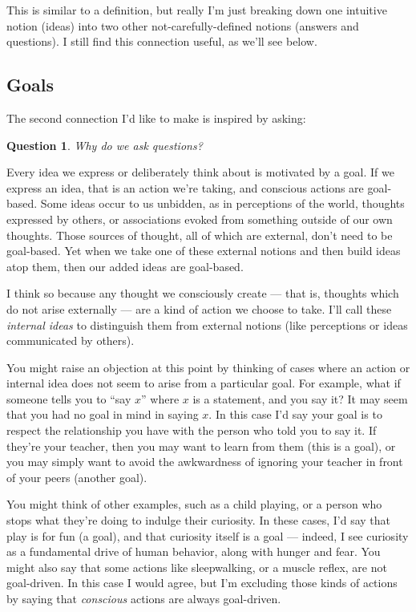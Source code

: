 \documentclass[11pt, oneside]{article}   	%
\newtheorem{question}{Question}
\begin{document}
This is similar to a definition, but really I'm just breaking down
one intuitive notion (ideas) into two other not-carefully-defined notions
(answers and questions). I still find this connection useful, as we'll see
below.

\subsection{Goals}

The second connection I'd like to make is inspired by asking:
\begin{question}
    Why do we ask questions?
\end{question}

Every idea we express or deliberately think about is motivated by a goal.
If we express an idea, that is an action we're taking,
and conscious actions are
goal-based.
Some ideas occur to us unbidden, as in perceptions of the world,
thoughts expressed by others, or associations evoked from something outside of
our own thoughts.
Those sources of thought, all of which are external, don't need to be
goal-based.
Yet when we take one of these external notions and then build
ideas atop them, then our added ideas are goal-based.

I think so because any thought we consciously create --- that is,
thoughts which do not arise externally --- are a kind of action
we choose to take. I'll call these {\em internal ideas} to
distinguish them from external notions (like perceptions or ideas
communicated by others).

You might raise an objection at this point by thinking of cases where
an action or internal idea does not seem to arise from a particular goal.
For example, what if someone tells you to ``say $x$'' where $x$ is a statement,
and you say it? It may seem that you had no goal in mind in saying $x$.
In this case I'd say your goal is to respect the relationship you have with the
person who told you to say it. If they're your teacher, then you may want to
learn from them (this is a goal), or you may simply want to avoid the
awkwardness of ignoring your teacher in front of your peers (another goal).

You might think of other examples, such as a child playing, or a person who
stops what they're doing to indulge their curiosity. In these cases, I'd say
that play is for fun (a goal), and that curiosity itself is a goal --- indeed, I
see curiosity as a fundamental drive of human behavior, along with hunger and
fear. You might also say that some actions like sleepwalking, or a muscle
reflex, are not goal-driven. In this case I would agree, but I'm excluding those
kinds of actions by saying that {\em conscious} actions are always goal-driven.
\end{document}
